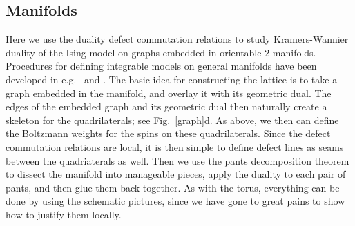 \documentclass[11pt]{article}
\numberwithin{equation}{section}		%
\begin{document}
\subsection{Manifolds }
Here we use the duality defect commutation relations to study Kramers-Wannier duality of the Ising model on graphs embedded in orientable 2-manifolds. Procedures for defining integrable models on general manifolds have been developed in e.g.\ \cite{Mercat2001} and \cite{Bobenko2002}.
The basic idea for constructing the lattice is to take a graph embedded in the manifold, and overlay it with its geometric dual. The edges of the embedded graph and its geometric dual then naturally create a skeleton for the quadrilaterals; see Fig.~\ref{graph}d. 
As above, we then can define the Boltzmann weights for the spins on these quadrilaterals. Since the defect commutation relations are local, it is then simple to define defect lines as seams between the quadriaterals as well. Then we use the pants decomposition theorem to dissect the manifold into manageable pieces, apply the duality to each pair of pants, and then glue them back together. As with the torus, everything can be done by using the schematic pictures, since we have gone to great pains to show how to justify them locally.
\end{document}

